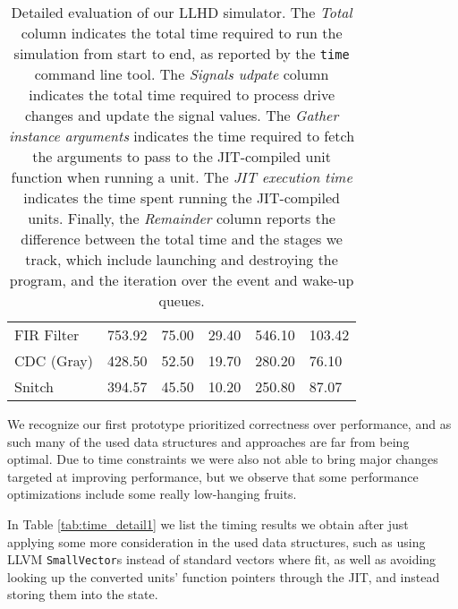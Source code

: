 \begin{table}
{\begin{tabular}{llllll}
            FIR Filter      & 753.92                 & 75.00                              & 29.40                              & 546.10                             & 103.42                             \\
            CDC (Gray)      & 428.50                 & 52.50                              & 19.70                              & 280.20                             & 76.10                              \\
            Snitch          & 394.57                 & 45.50                              & 10.20                              & 250.80                             & 87.07                              \\ \bottomrule
        \end{tabular}
    }
    \caption[Detailed performance evaluation for our LLHD simulator.]{Detailed evaluation of our LLHD simulator. The \textit{Total} column indicates the total time required to run the simulation from start to end, as reported by the \texttt{time} command line tool. The \textit{Signals udpate} column indicates the total time required to process drive changes and update the signal values. The \textit{Gather instance arguments} indicates the time required to fetch the arguments to pass to the JIT-compiled unit function when running a unit. The \textit{JIT execution time} indicates the time spent running the JIT-compiled units. Finally, the \textit{Remainder} column reports the difference between the total time and the stages we track, which include launching and destroying the program, and the iteration over the event and wake-up queues.}
    \label{tab:time_detail0}
\end{table}

We recognize our first prototype prioritized correctness over performance, and as such many of the used data structures and approaches are far from being optimal. Due to time constraints we were also not able to bring major changes targeted at improving performance, but we observe that some performance optimizations include some really low-hanging fruits.

In Table \ref{tab:time_detail1} we list the timing results we obtain after just applying some more consideration in the used data structures, such as using LLVM \texttt{SmallVector}s instead of standard vectors where fit, as well as avoiding looking up the converted units' function pointers through the JIT, and instead storing them into the state.

